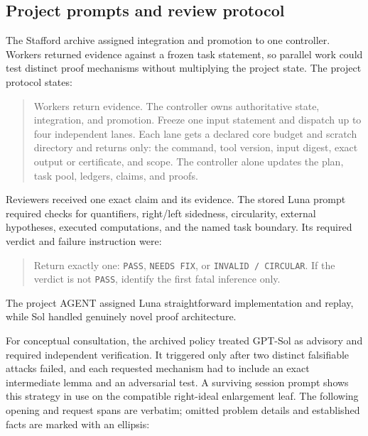 
\subsection{Project prompts and review protocol}

The Stafford archive assigned integration and promotion to one controller.
Workers returned evidence against a frozen task statement, so parallel work
could test distinct proof mechanisms without multiplying the project state.
The project protocol states:

\begin{quote}\small
Workers return evidence. The controller owns authoritative state, integration,
and promotion. Freeze one input statement and dispatch up to four independent
lanes. Each lane gets a declared core budget and scratch directory and returns
only: the command, tool version, input digest, exact output or certificate,
and scope. The controller alone updates the plan, task pool, ledgers, claims,
and proofs.
\end{quote}

Reviewers received one exact claim and its evidence. The stored Luna prompt
required checks for quantifiers, right/left sidedness, circularity, external
hypotheses, executed computations, and the named task boundary. Its required
verdict and failure instruction were:

\begin{quote}\small
Return exactly one: \texttt{PASS}, \texttt{NEEDS FIX}, or
\texttt{INVALID / CIRCULAR}. If the verdict is not \texttt{PASS}, identify the
first fatal inference only.
\end{quote}
The project AGENT assigned Luna straightforward implementation and replay,
while Sol handled genuinely novel proof architecture.

For conceptual consultation, the archived policy treated GPT-Sol as advisory
and required independent verification. It triggered only after two distinct
falsifiable attacks failed, and each requested mechanism had to include an
exact intermediate lemma and an adversarial test. A surviving session prompt
shows this strategy in use on the compatible right-ideal enlargement leaf. The
following opening and request spans are verbatim; omitted problem details and
established facts are marked with an ellipsis:

